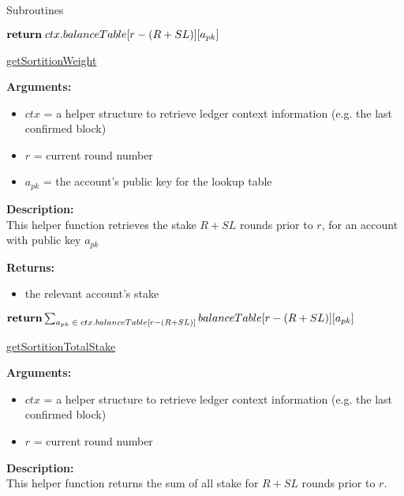 \documentclass[10pt,a4paper]{article}
\begin{document}
\begin{section}{Subroutines}
\begin{algorithm}[H]
\begin{algorithmic}[1]
            $\Return\;ctx.balanceTable[r - (R + SL)][a_{pk}]$

        \EndFunction
    \end{algorithmic}
    \caption{\underline{getSortitionWeight}}
\end{algorithm}

\noindent \textbf{Arguments:}
\begin{itemize}
    \item $ctx$ = a helper structure to retrieve ledger context information (e.g. the last confirmed block)
    \item $r$ = current round number
    \item $a_{pk}$ = the account's public key for the lookup table
  \end{itemize}


\noindent \textbf{Description:}\\
This helper function retrieves the stake $R + SL$ rounds prior to $r$, for an account
with public key $a_{pk}$

\noindent \textbf{Returns:}
\begin{itemize}
    \item the relevant account's stake
  \end{itemize}




\begin{algorithm}[H]\label{algo:get-sortition-W}
    \begin{algorithmic}[1]
        
        $\Return \sum_{a_{pk}\;\in\;ctx.balanceTable[r - (R + SL)]}{balanceTable[r - (R + SL)][a_{pk}]}$

        \EndFunction
    \end{algorithmic}
    \caption{\underline{getSortitionTotalStake}}
\end{algorithm}

\noindent \textbf{Arguments:}
\begin{itemize}
    \item $ctx$ = a helper structure to retrieve ledger context information (e.g. the last confirmed block)
    \item $r$ = current round number
  \end{itemize}


\noindent \textbf{Description:}\\
This helper function returns the sum of all stake for $R + SL$ rounds prior to $r$.


\end{section}
\end{document}
